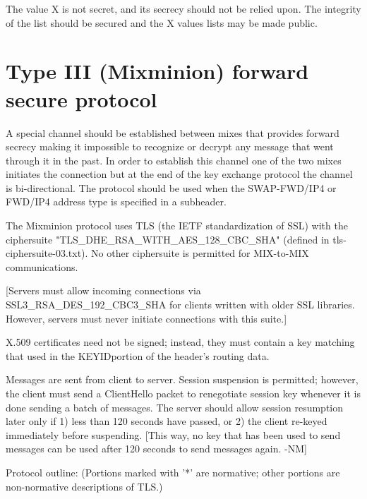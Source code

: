 The value X is not secret, and its secrecy should not be relied upon.
The integrity of the list should be secured and the X values lists may
be made public.

\section{Type III (Mixminion) forward secure protocol}

A special channel should be established between mixes that provides
forward secrecy making it impossible to recognize or decrypt any
message that went through it in the past. In order to establish this
channel one of the two mixes initiates the connection but at the end
of the key exchange protocol the channel is bi-directional. The
protocol should be used when the SWAP-FWD/IP4 or FWD/IP4 address type
is specified in a subheader.

The Mixminion protocol uses TLS (the IETF standardization of SSL) with
the ciphersuite "TLS_DHE_RSA_WITH_AES_128_CBC_SHA" (defined in
tls-ciphersuite-03.txt).  No other ciphersuite is permitted for
MIX-to-MIX communications.

[Servers must allow incoming connections via SSL3_RSA_DES_192_CBC3_SHA
for clients written with older SSL libraries.  However, servers must
never initiate connections with this suite.]

X.509 certificates need not be signed; instead, they must contain
a key matching that used in the KEYIDportion of the header's routing
data.  

Messages are sent from client to server.  Session suspension is
permitted; however, the client must send a ClientHello packet to
renegotiate session key whenever it is done sending a batch of
messages.  The server should allow session resumption later only if 1)
less than 120 seconds have passed, or 2) the client re-keyed
immediately before suspending.  [This way, no key that has been used
to send messages can be used after 120 seconds to send messages
again. -NM]

Protocol outline: (Portions marked with '*' are normative; other
portions are non-normative descriptions of TLS.)

